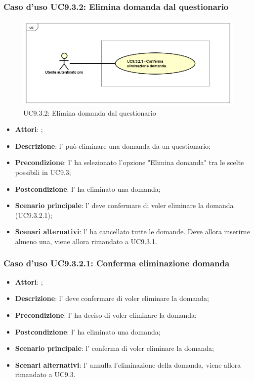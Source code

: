 		 \subsubsection{Caso d'uso UC9.3.2: Elimina domanda dal questionario}
		 \label{UC9.3.2}
		 \begin{figure}[h]
		 	\centering
		 	\includegraphics[scale=0.5,keepaspectratio]{UML/UC9_3_2.png}
		 	\caption{UC9.3.2: Elimina domanda dal questionario}
		 \end{figure}
		 \FloatBarrier
		 \begin{itemize}
		 	\item \textbf{Attori}: \uaupro{};
		 	\item \textbf{Descrizione}: l'\uaupro{} può eliminare una domanda da un questionario;
		 	\item \textbf{Precondizione}: l'\uaupro{} ha selezionato l'opzione "Elimina domanda" tra le scelte possibili in UC9.3;
		 	\item \textbf{Postcondizione}: l'\uaupro{} ha eliminato una domanda;
		 	\item \textbf{Scenario principale}: l'\uaupro{} deve confermare di voler eliminare la domanda (UC9.3.2.1); 
		 	\item \textbf{Scenari alternativi}: l'\uaupro{} ha cancellato tutte le domande. Deve allora inserirne almeno una, viene allora rimandato a UC9.3.1.
		 \end{itemize}
		 
		 \subsubsection{Caso d'uso UC9.3.2.1: Conferma eliminazione domanda}
		 \label{UC9.3.2.1}
		 \begin{itemize}
		 	\item \textbf{Attori}: \uaupro{};
		 	\item \textbf{Descrizione}: l'\uaupro{} deve confermare di voler eliminare la domanda;
		 	\item \textbf{Precondizione}: l'\uaupro{} ha deciso di voler eliminare la domanda;
		 	\item \textbf{Postcondizione}: l'\uaupro{} ha eliminato una domanda;
		 	\item \textbf{Scenario principale}: l'\uaupro{} conferma di voler eliminare la domanda;
		 	\item \textbf{Scenari alternativi}: l'\uaupro{} annulla l'eliminazione della domanda, viene allora rimandato a UC9.3.
		 \end{itemize}
		 

